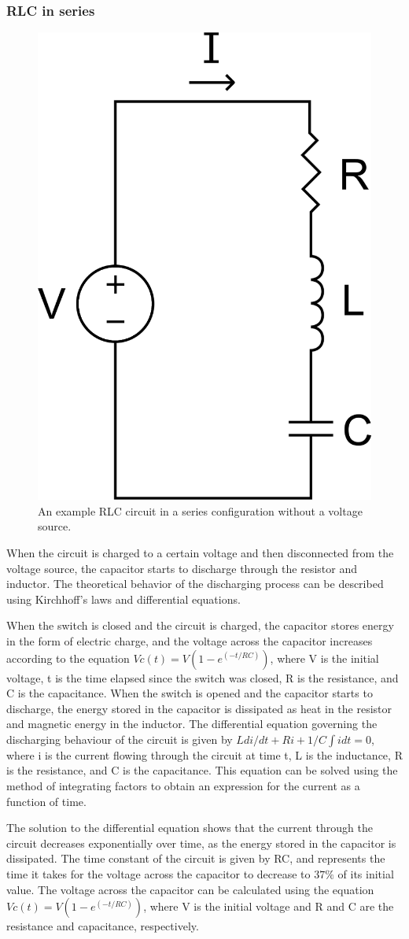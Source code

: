 \documentclass[12pt,twoside]{extarticle}
\begin{document}
\subsubsection{RLC in series}

\begin{figure}[ht]
    \centering
    \includegraphics[width=0.35\columnwidth]{figures/RLC_series.png}
    \caption{An example RLC circuit in a series configuration without a voltage source.}
    \label{fig:seriesRLC}
\end{figure}
When the circuit is charged to a certain voltage and then disconnected from the voltage source, the capacitor starts to discharge through the resistor and inductor. The theoretical behavior of the discharging process can be described using Kirchhoff's laws and differential equations.


When the switch is closed and the circuit is charged, the capacitor stores energy in the form of electric charge, and the voltage across the capacitor increases according to the equation $Vc(t) = V(1 - e^(-t/RC))$, where V is the initial voltage, t is the time elapsed since the switch was closed, R is the resistance, and C is the capacitance. When the switch is opened and the capacitor starts to discharge, the energy stored in the capacitor is dissipated as heat in the resistor and magnetic energy in the inductor.
The differential equation governing the discharging behaviour of the circuit is given by $L di/dt + Ri + 1/C \int idt = 0$, where i is the current flowing through the circuit at time t, L is the inductance, R is the resistance, and C is the capacitance. This equation can be solved using the method of integrating factors to obtain an expression for the current as a function of time.

The solution to the differential equation shows that the current through the circuit decreases exponentially over time, as the energy stored in the capacitor is dissipated. The time constant of the circuit is given by RC, and represents the time it takes for the voltage across the capacitor to decrease to $37\%$ of its initial value. The voltage across the capacitor can be calculated using the equation $Vc(t) = V(1 - e^(-t/RC))$, where V is the initial voltage and R and C are the resistance and capacitance, respectively.
\end{document}
